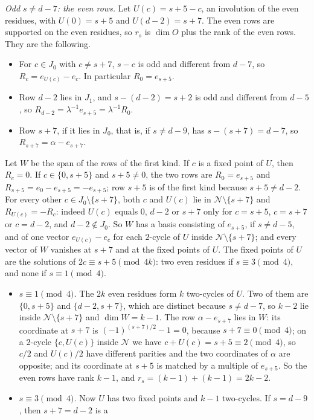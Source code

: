 \begin{informalproof}
\emph{Odd $s\ne d-7$: the even rows.} Let $U(c)=s+5-c$, an involution of the even residues, with $U(0)=s+5$ and
$U(d-2)=s+7$. The even rows are supported on the even residues, so $r_s$ is $\dim O$ plus the rank of the even rows.
They are the following.
\begin{itemize}[leftmargin=1.5em]
\item For $c\in J_0$ with $c\ne s+7$, $s-c$ is odd and different from $d-7$, so $R_c=e_{U(c)}-e_c$. In particular
$R_0=e_{s+5}$.
\item Row $d-2$ lies in $J_1$, and $s-(d-2)=s+2$ is odd and different from $d-5$, so
$R_{d-2}=\lambda^{-1}e_{s+5}=\lambda^{-1}R_0$.
\item Row $s+7$, if it lies in $J_0$, that is, if $s\ne d-9$, has $s-(s+7)=d-7$, so $R_{s+7}=\alpha-e_{s+7}$.
\end{itemize}
Let $W$ be the span of the rows of the first kind. If $c$ is a fixed point of $U$, then $R_c=0$. If $c\in\{0,s+5\}$ and
$s+5\ne0$, the two rows are $R_0=e_{s+5}$ and $R_{s+5}=e_0-e_{s+5}=-e_{s+5}$; row $s+5$ is of the first kind because
$s+5\ne d-2$. For every other $c\in J_0\setminus\{s+7\}$, both $c$ and $U(c)$ lie in $\mathcal N\setminus\{s+7\}$ and
$R_{U(c)}=-R_c$: indeed $U(c)$ equals $0$, $d-2$ or $s+7$ only for $c=s+5$, $c=s+7$ or $c=d-2$, and $d-2\notin J_0$.
So $W$ has a basis consisting of $e_{s+5}$,
if $s\ne d-5$, and of one vector $e_{U(c)}-e_c$ for each $2$-cycle of $U$ inside $\mathcal N\setminus\{s+7\}$; and every
vector of $W$ vanishes at $s+7$ and at the fixed points of $U$. The fixed points of $U$ are the solutions of
$2c\equiv s+5\pmod{4k}$: two even residues if $s\equiv3\pmod4$, and none if $s\equiv1\pmod4$.
\begin{itemize}[leftmargin=1.5em]
\item \emph{$s\equiv1\pmod4$.} The $2k$ even residues form $k$ two-cycles of $U$. Two of them are $\{0,s+5\}$ and
$\{d-2,s+7\}$, which are distinct because $s\ne d-7$, so $k-2$ lie inside $\mathcal N\setminus\{s+7\}$ and
$\dim W=k-1$. The row $\alpha-e_{s+7}$ lies in $W$: its coordinate at $s+7$ is $(-1)^{(s+7)/2}-1=0$, because
$s+7\equiv0\pmod4$; on a $2$-cycle $\{c,U(c)\}$ inside $\mathcal N$ we have $c+U(c)=s+5\equiv2\pmod4$, so $c/2$ and
$U(c)/2$ have different parities and the two coordinates of $\alpha$ are opposite; and its coordinate at $s+5$ is
matched by a multiple of $e_{s+5}$. So the even rows have rank $k-1$, and $r_s=(k-1)+(k-1)=2k-2$.
\item \emph{$s\equiv3\pmod4$.} Now $U$ has two fixed points and $k-1$ two-cycles. If $s=d-9$, then $s+7=d-2$ is a

\end{itemize}
\end{informalproof}
